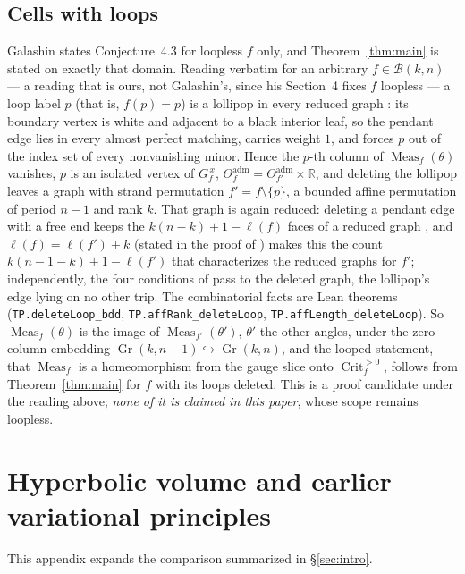 \documentclass[11pt]{article}
\theoremstyle{definition}
\DeclareMathOperator{\Gr}{Gr}
\DeclareMathOperator{\Meas}{Meas}
\DeclareMathOperator{\Crit}{Crit}
\newcommand{\R}{\mathbb{R}}
\newcommand{\Theadm}{\Theta_f^{\mathrm{adm}}}
\newcommand{\Critf}{\Crit_f^{>0}}
\begin{document}
\subsection{Cells with loops}\label{app:loops}
Galashin states Conjecture~4.3 for loopless $f$ only, and Theorem~\ref{thm:main} is stated on exactly that
domain. Reading \cite[Def.~1.8]{Galashin} verbatim for an arbitrary $f\in\mathcal B(k,n)$ --- a reading
that is ours, not Galashin's, since his Section~4 fixes $f$ loopless --- a loop label $p$ (that is,
$f(p)=p$) is a lollipop in every reduced graph \cite[\S2.2]{Galashin}: its boundary vertex is white and
adjacent to a black interior leaf, so the pendant edge lies in every almost perfect matching, carries
weight $1$, and forces $p$ out of the index set of every nonvanishing minor. Hence the $p$-th column
of $\Meas_f(\theta)$ vanishes, $p$ is an isolated vertex of $G_f^{\,x}$, $\Theadm=\Theta_{f'}^{\mathrm{adm}}\times\R$,
and deleting the lollipop leaves a graph with strand permutation $f'=f\setminus\{p\}$,
a bounded affine permutation of period $n-1$ and rank $k$. That graph is again reduced: deleting a pendant
edge with a free end keeps the $k(n-k)+1-\ell(f)$ faces of a reduced graph \cite[\S2.2]{Galashin},
and $\ell(f)=\ell(f')+k$ (stated in the proof of \cite[Thm.~7.12]{LamGrassmann}) makes this the count
$k(n-1-k)+1-\ell(f')$ that characterizes the reduced graphs for $f'$; independently, the four conditions
of \cite[Thm.~13.2]{Postnikov} pass to the deleted graph, the lollipop's edge lying on no other trip.
The combinatorial facts are Lean theorems (\texttt{TP.\allowbreak deleteLoop\_\allowbreak bdd}, \texttt{TP.\allowbreak affRank\_\allowbreak deleteLoop}, \texttt{TP.\allowbreak affLength\_\allowbreak deleteLoop}). So $\Meas_f(\theta)$ is the image of
$\Meas_{f'}(\theta')$, $\theta'$ the other angles, under the zero-column embedding $\Gr(k,n-1)\hookrightarrow\Gr(k,n)$,
and the looped statement, that $\Meas_f$ is a homeomorphism from the gauge slice onto
$\Critf$, follows from Theorem~\ref{thm:main} for $f$ with its loops deleted. This is a proof candidate
under the reading above; \emph{none of it is claimed in this paper}, whose scope remains loopless.


\section{Hyperbolic volume and earlier variational principles}\label{app:volume}
This appendix expands the comparison summarized in \S\ref{sec:intro}.
\end{document}
